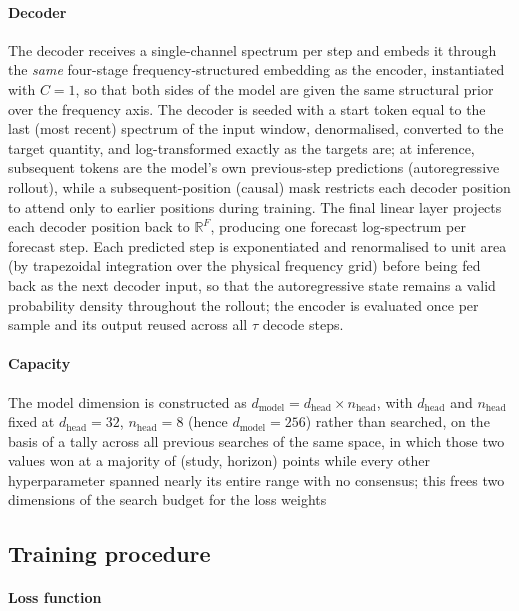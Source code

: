 \paragraph{Decoder}
The decoder receives a single-channel spectrum per step and embeds it through the \emph{same} four-stage frequency-structured embedding as the encoder, instantiated with $C=1$, so that both sides of the model are given the same structural prior over the frequency axis. The decoder is seeded with a start token equal to the last (most recent) spectrum of the input window, denormalised, converted to the target quantity, and log-transformed exactly as the targets are; at inference, subsequent tokens are the model's own previous-step predictions (autoregressive rollout), while a subsequent-position (causal) mask restricts each decoder position to attend only to earlier positions during training. The final linear layer projects each decoder position back to $\mathbb{R}^{F}$, producing one forecast log-spectrum per forecast step. Each predicted step is exponentiated and renormalised to unit area (by trapezoidal integration over the physical frequency grid) before being fed back as the next decoder input, so that the autoregressive state remains a valid probability density throughout the rollout; the encoder is evaluated once per sample and its output reused across all $\tau$ decode steps.

\paragraph{Capacity}
The model dimension is constructed as $d_{\text{model}} = d_{\text{head}}
\times n_{\text{head}}$, with $d_{\text{head}}$ and $n_{\text{head}}$ fixed at $d_{\text{head}}=32$, $n_{\text{head}}=8$ (hence $d_{\text{model}}=256$) rather than searched, on the basis of a tally across all previous searches of the same space, in which those two values won at a majority of (study, horizon) points while every other hyperparameter spanned nearly its entire range with no consensus; this frees two dimensions of the search budget for the loss weights 

\subsection{Training procedure}
\label{sec:training}

\paragraph{Loss function}


